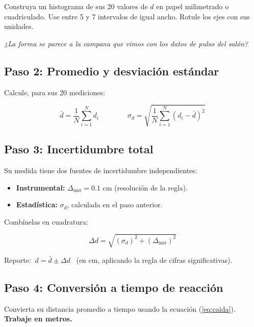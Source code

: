 \documentclass[11pt, letterpaper]{article}
\begin{document}
	Construya un histograma de sus 20 valores de $d$ en papel milimetrado o cuadriculado.
	Use entre 5 y 7 intervalos de igual ancho. Rotule los ejes con sus unidades.
	
	\vspace{0.2cm}
	\noindent
	\textit{¿La forma se parece a la campana que vimos con los datos de pulso del salón?}
	
	\subsection*{Paso 2: Promedio y desviación estándar}
	
	Calcule, para sus 20 mediciones:
	
	\begin{equation}
	\bar{d} = \frac{1}{N}\sum_{i=1}^{N} d_i
	\qquad\qquad
	\sigma_d = \sqrt{\frac{1}{N}\sum_{i=1}^{N}\left(d_i - \bar{d}\right)^2}
	\end{equation}
	
	\subsection*{Paso 3: Incertidumbre total}
	
	Su medida tiene dos fuentes de incertidumbre independientes:
	
	\begin{itemize}
		\item \textbf{Instrumental:} $\Delta_{\text{inst}} = 0.1$ cm (resolución de la regla).
		\item \textbf{Estadística:} $\sigma_d$, calculada en el paso anterior.
	\end{itemize}
	
	Combínelas en cuadratura:
	
	\begin{equation}
	\Delta d = \sqrt{\left(\sigma_d\right)^2 + \left(\Delta_{\text{inst}}\right)^2}
	\end{equation}
	
	\noindent
	Reporte: $\ d = \bar{d} \pm \Delta d$ \ (en cm, aplicando la regla de cifras significativas).
	
	\subsection*{Paso 4: Conversión a tiempo de reacción}
	
	Convierta su distancia promedio a tiempo usando la ecuación (\ref{eq:caida}).
	\textbf{Trabaje en metros.}
	
\end{document}
